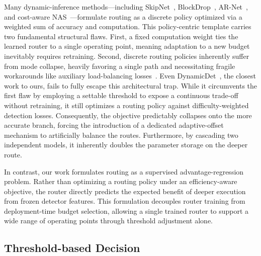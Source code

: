 Many dynamic-inference methods—including SkipNet~\cite{wang2018skipnet}, BlockDrop~\cite{wu2018blockdrop}, AR-Net~\cite{meng2020ar}, and cost-aware NAS~\cite{dai2020danas}—formulate routing as a discrete policy optimized via a weighted sum of accuracy and computation. This policy-centric template carries two fundamental structural flaws. 
First, a fixed computation weight ties the learned router to a single operating point, meaning adaptation to a new budget inevitably requires retraining. 
Second, discrete routing policies inherently suffer from mode collapse, heavily favoring a single path and necessitating fragile workarounds like auxiliary load-balancing losses~\cite{shazeer2017,fedus2022switch,riquelme2021scaling}.
Even DynamicDet~\cite{lin2023dynamicdet}, the closest work to ours, fails to fully escape this architectural trap. 
While it circumvents the first flaw by employing a settable threshold to expose a continuous trade-off without retraining, it still optimizes a routing policy against difficulty-weighted detection losses.
Consequently, the objective predictably collapses onto the more accurate branch, forcing the introduction of a dedicated adaptive-offset mechanism to artificially balance the routes. 
Furthermore, by cascading two independent models, it inherently doubles the parameter storage on the deeper route.

In contrast, our work formulates routing as a supervised advantage-regression
problem. Rather than optimizing a routing policy under an efficiency-aware
objective, the router directly predicts the expected benefit of deeper
execution from frozen detector features. This formulation decouples router
training from deployment-time budget selection, allowing a single trained
router to support a wide range of operating points through threshold
adjustment alone.

\subsection{Threshold-based Decision}
